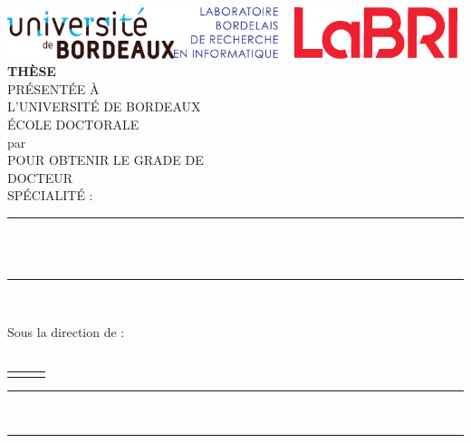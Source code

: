 \pagestyle{empty}

\pagestyle{plain} %

\newcommand{\exam}[5]{#1 \textsc{#2}  & #3, #4  & #5 \\}

\newcommand{\logoLeft}{\includegraphics[height=1.5cm]{figures/ubdx-logo}}
\newcommand{\logoRight}{\includegraphics[height=1.5cm]{figures/labri-logo}}


\begin{titlepage}
    \begin{center}
		\vspace*{-40pt}
		\logoLeft \hfill \logoRight \\
		\vfill
		\Huge  {\textbf{THÈSE}}\\
		\bigskip
		\large PRÉSENTÉE À\\
		\bigskip
		\huge  {L'UNIVERSITÉ DE BORDEAUX}\\
		\bigskip
		\Large ÉCOLE DOCTORALE {\ecoleDoctorale}\\
		\bigskip
		\Large par {\textbf{\myName}}\\
		\bigskip
		\Large POUR OBTENIR LE GRADE DE\\
		\bigskip
		\LARGE {DOCTEUR}\\
		\bigskip
		\large SPÉCIALITÉ : {\specialite}\\
		\vfill
		\rule{4em}{1pt}\\
		\bigskip
		\Large {{\myTitle}}\\
		\bigskip
		\rule{4em}{1pt}\\
		\medskip
		\vfill
	\end{center}
	\vfill
	 \quad {}
	\vfill
	\noindent Sous la direction de :  \directors\\

	 \\
	\begin{tabularx}{\textwidth}{p{}<{\dotfill}p{}<{\dotfill}@{}l}
		\jury
	\end{tabularx}
	\vfill
	\centering
	\large \rule[0.2em]{0.5em}{1pt}~{\annee}~\rule[0.2em]{0.5em}{1pt}
\end{titlepage}
